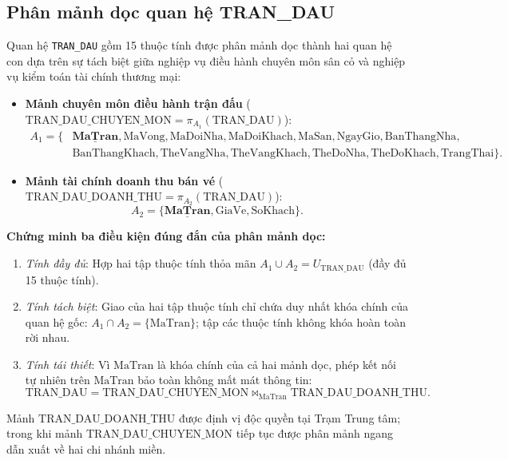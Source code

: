 \subsection{Phân mảnh dọc quan hệ TRAN\_DAU}
Quan hệ \texttt{TRAN\_DAU} gồm 15 thuộc tính được phân mảnh dọc thành hai quan hệ con dựa trên sự tách biệt giữa nghiệp vụ điều hành chuyên môn sân cỏ và nghiệp vụ kiểm toán tài chính thương mại:
\begin{itemize}
    \item \textbf{Mảnh chuyên môn điều hành trận đấu} ($\text{TRAN\_DAU\_CHUYEN\_MON} = \pi_{A_1}(\text{TRAN\_DAU})$):
    \begin{align*}
        A_1 = \{&\underline{\mathbf{MaTran}}, \text{MaVong}, \text{MaDoiNha}, \text{MaDoiKhach}, \text{MaSan}, \text{NgayGio}, \text{BanThangNha}, \\
        &\text{BanThangKhach}, \text{TheVangNha}, \text{TheVangKhach}, \text{TheDoNha}, \text{TheDoKhach}, \text{TrangThai}\}.
    \end{align*}
    \item \textbf{Mảnh tài chính doanh thu bán vé} ($\text{TRAN\_DAU\_DOANH\_THU} = \pi_{A_2}(\text{TRAN\_DAU})$):
    $$A_2 = \{\underline{\mathbf{MaTran}}, \text{GiaVe}, \text{SoKhach}\}.$$
\end{itemize}

\textbf{Chứng minh ba điều kiện đúng đắn của phân mảnh dọc:}
\begin{enumerate}
    \item \textit{Tính đầy đủ}: Hợp hai tập thuộc tính thỏa mãn $A_1 \cup A_2 = U_{\text{TRAN\_DAU}}$ (đầy đủ 15 thuộc tính).
    \item \textit{Tính tách biệt}: Giao của hai tập thuộc tính chỉ chứa duy nhất khóa chính của quan hệ gốc: $A_1 \cap A_2 = \{\text{MaTran}\}$; tập các thuộc tính không khóa hoàn toàn rời nhau.
    \item \textit{Tính tái thiết}: Vì $\text{MaTran}$ là khóa chính của cả hai mảnh dọc, phép kết nối tự nhiên trên $\text{MaTran}$ bảo toàn không mất mát thông tin:
    $$\text{TRAN\_DAU} = \text{TRAN\_DAU\_CHUYEN\_MON} \bowtie_{\text{MaTran}} \text{TRAN\_DAU\_DOANH\_THU}.$$
\end{enumerate}
Mảnh $\text{TRAN\_DAU\_DOANH\_THU}$ được định vị độc quyền tại Trạm Trung tâm; trong khi mảnh $\text{TRAN\_DAU\_CHUYEN\_MON}$ tiếp tục được phân mảnh ngang dẫn xuất về hai chi nhánh miền.

